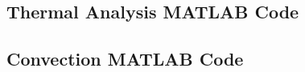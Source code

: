\documentclass[a4paper,12pt,oneside]{article} %
\begin{document}
\begin{appendices}



\newpage
\section{Thermal Analysis MATLAB Code} \label{sec:appJ}
\subsection{Convection MATLAB Code}


\end{appendices}
\end{document}
